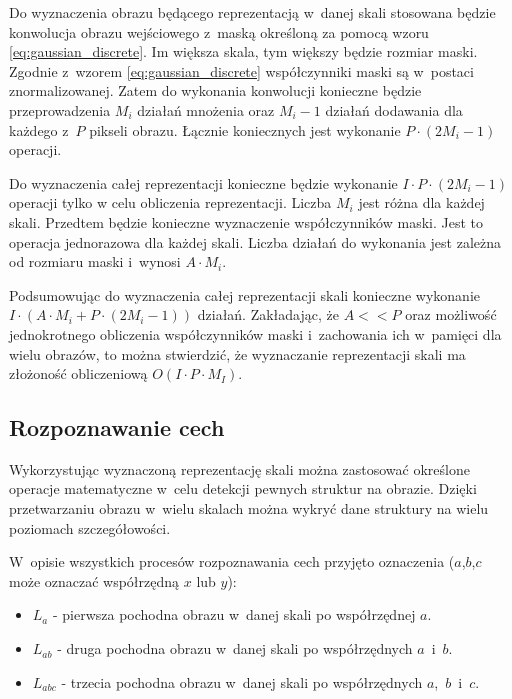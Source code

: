 Do wyznaczenia obrazu będącego reprezentacją w~danej skali stosowana będzie konwolucja obrazu wejściowego z~maską określoną za pomocą wzoru \eqref{eq:gaussian_discrete}. Im większa skala, tym większy będzie rozmiar maski. Zgodnie z~wzorem \eqref{eq:gaussian_discrete} współczynniki maski są w~postaci znormalizowanej. Zatem do wykonania konwolucji konieczne będzie przeprowadzenia $ M_i $ działań mnożenia oraz $ M_i - 1 $ działań dodawania dla każdego z~$P$ pikseli obrazu. Łącznie koniecznych jest wykonanie $ P \cdot (2M_i - 1) $ operacji.

Do wyznaczenia całej reprezentacji konieczne będzie wykonanie 
$ I \cdot P \cdot (2M_i - 1) $ operacji tylko w celu obliczenia reprezentacji. Liczba $ M_i $ jest różna dla każdej skali. Przedtem będzie konieczne wyznaczenie współczynników maski. Jest to operacja jednorazowa dla każdej skali. Liczba działań do wykonania jest zależna od rozmiaru maski i~wynosi $ A \cdot M_i $.

Podsumowując do wyznaczenia całej reprezentacji skali konieczne wykonanie $ I \cdot (A \cdot M_i + P \cdot (2M_i - 1)) $ działań. Zakładając, że $ A << P $ oraz możliwość jednokrotnego obliczenia współczynników maski i~zachowania ich w~pamięci dla wielu obrazów, to można stwierdzić, że wyznaczanie reprezentacji skali ma złożoność obliczeniową $ O(I \cdot P \cdot M_I) $.

\subsection{Rozpoznawanie cech}
\label{subsec:rozpoznawanie}

Wykorzystując wyznaczoną reprezentację skali można zastosować określone operacje matematyczne w~celu detekcji pewnych struktur na obrazie. Dzięki przetwarzaniu obrazu w~wielu skalach można wykryć dane struktury na wielu poziomach szczegółowości.

W~opisie wszystkich procesów rozpoznawania cech przyjęto oznaczenia ($ a$,$ b$,$ c $ może oznaczać współrzędną $ x $ lub $ y $):

\begin{itemize}
\item $ L_a $ - pierwsza pochodna obrazu w~danej skali po współrzędnej $ a $.
\item $ L_{ab} $ - druga pochodna obrazu w~danej skali po współrzędnych $ a $~i~$b$.
\item $ L_{abc} $ - trzecia pochodna obrazu w~danej skali po współrzędnych $ a $,~$b$~i~$c$.
\end{itemize}


